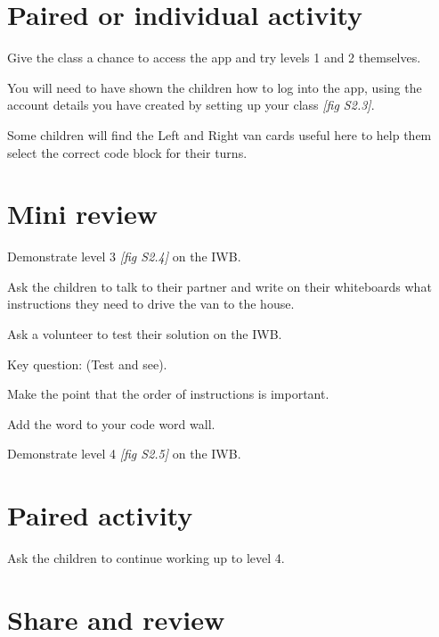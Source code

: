 \documentclass{../../../lessonplan}
\begin{document}
\begin{lessonplan}
\section*{Paired or individual activity}

Give the class a chance to access the app and try levels 1 and 2 themselves.

You will need to have shown the children how to log into the app, using the account details you have created by setting up your class \textit{[fig S2.3]}.


Some children will find the Left and Right van cards useful here to help them select the correct code block for their turns.

\section*{Mini review}

Demonstrate level 3 \textit{[fig S2.4]} on the IWB.



Ask the children to talk to their partner and write on their whiteboards what instructions they need to drive the van to the house.

Ask a volunteer to test their solution on the IWB.

Key question:  (Test and see).

Make the point that the order of instructions is important.

Add the word  to your code word wall.

Demonstrate level 4 \textit{[fig S2.5]} on the IWB.


\section*{Paired activity}

Ask the children to continue working up to level 4.

\section*{Share and review}


\end{lessonplan}
\end{document}
